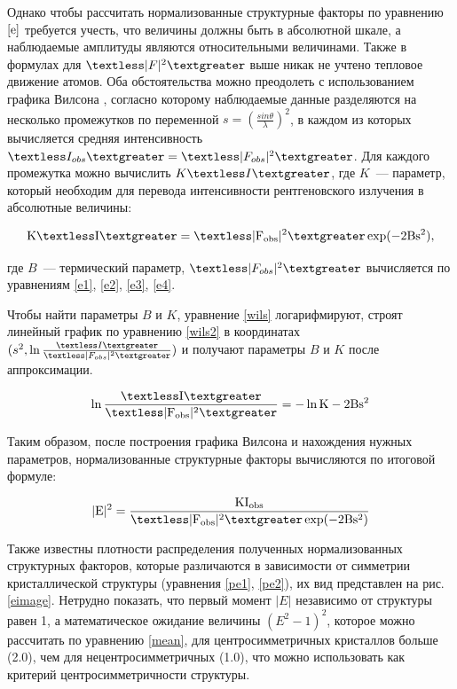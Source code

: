 Однако чтобы рассчитать нормализованные структурные факторы по уравнению $\ref{e}$ требуется учесть, что величины должны быть в абсолютной шкале, а наблюдаемые амплитуды являются относительными величинами. Также в формулах для $\textless|F|^2\textgreater$ выше никак не учтено тепловое движение атомов. Оба обстоятельства можно преодолеть с использованием графика Вилсона \cite{wilson_determination_1942}, согласно которому наблюдаемые данные разделяются на несколько промежутков по переменной $s =\left( \frac{sin \theta}{\lambda}\right)^2$, в каждом из которых вычисляется средняя интенсивность $\textless I_{obs}\textgreater = \textless|F_{obs}|^2\textgreater$. Для каждого промежутка можно вычислить $K\textless I\textgreater$, где $K$~--- параметр, который необходим для перевода интенсивности рентгеновского излучения в абсолютные величины:

\begin{equation}\label{wils}
	\mathrm{K\textless I\textgreater = \textless|F_{obs}|^2\textgreater\exp(-2Bs^2)},
\end{equation}

где $B$~--- термический параметр, $\textless|F_{obs}|^2\textgreater$ вычисляется по уравнениям \ref{e1}, \ref{e2}, \ref{e3}, \ref{e4}.

Чтобы найти параметры $B$ и $K$, уравнение \ref{wils} логарифмируют, строят линейный график по уравнению \ref{wils2} в координатах $(s^2,\ln\frac{\textless I\textgreater}{\textless|F_{obs}|^2\textgreater})$ и получают параметры $B$ и $K$ после аппроксимации.

\begin{equation}\label{wils2}
	\mathrm{\ln\frac{\textless I\textgreater}{\textless|F_{obs}|^2\textgreater} = -\ln K-2Bs^2}
\end{equation}

Таким образом, после построения графика Вилсона и нахождения нужных параметров, нормализованные структурные факторы вычисляются по итоговой формуле:

\begin{equation}
	\mathrm{|E|^2 = \frac{KI_{obs}}{\textless|F_{obs}|^2\textgreater\exp(-2Bs^2)}}
\end{equation}

Также известны \cite{giacovazzo_international_2010} плотности распределения полученных нормализованных структурных факторов, которые различаются в зависимости от симметрии кристаллической структуры (уравнения \ref{pe1}, \ref{pe2}), их вид представлен на рис. \ref{eimage}. Нетрудно показать, что первый момент $|E|$ независимо от структуры равен 1, а математическое ожидание величины $(E^2-1)^2$, которое можно рассчитать по уравнению \ref{mean}, для центросимметричных кристаллов больше (2.0), чем для нецентросимметричных (1.0), что можно использовать как критерий центросимметричности структуры.


